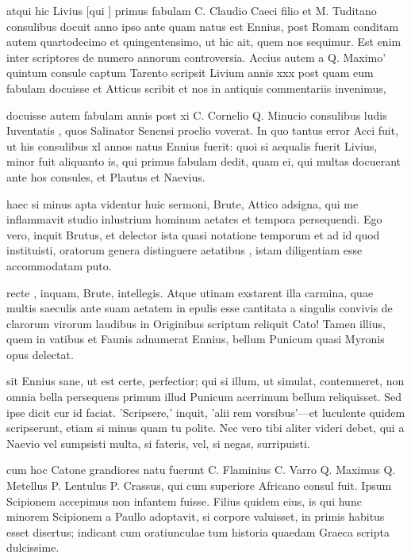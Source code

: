  atqui hic Livius [qui ] primus fabulam C. Claudio Caeci filio et M. Tuditano consulibus docuit anno ipso ante quam natus est Ennius, post Romam conditam autem quartodecimo et quingentensimo, ut hic ait, quem nos sequimur. Est enim inter scriptores de numero annorum controversia. Accius autem a Q. Maximo' quintum consule captum Tarento scripsit Livium annis xxx post quam eum fabulam docuisse et Atticus scribit et nos in antiquis commentariis invenimus,

 docuisse autem fabulam annis post xi C. Cornelio Q. Minucio consulibus ludis Iuventatis , quos Salinator Senensi proelio voverat. In quo tantus error Acci fuit, ut his consulibus xl annos natus Ennius fuerit: quoi si aequalis fuerit Livius, minor fuit aliquanto is, qui primus fabulam dedit, quam ei, qui multas docuerant ante hos consules, et Plautus et Naevius.

 haec si minus apta videntur huic sermoni, Brute, Attico adsigna, qui me inflammavit studio inlustrium hominum aetates et tempora persequendi. Ego vero, inquit Brutus, et delector ista quasi notatione temporum et ad id quod instituisti, oratorum genera distinguere aetatibus , istam diligentiam esse accommodatam puto.

 recte , inquam, Brute, intellegis. Atque utinam exstarent illa carmina, quae multis saeculis ante suam aetatem in epulis esse cantitata a singulis convivis de clarorum virorum laudibus in Originibus scriptum reliquit Cato! Tamen illius, quem in vatibus et Faunis adnumerat Ennius, bellum Punicum quasi Myronis opus delectat.

 sit Ennius sane, ut est certe, perfectior; qui si illum, ut simulat, contemneret, non omnia bella persequens primum illud Punicum acerrimum bellum reliquisset. Sed ipse dicit cur id faciat. 'Scripsere,' inquit, 'alii rem vorsibus'—et luculente quidem scripserunt, etiam si minus quam tu polite. Nec vero tibi aliter videri debet, qui a Naevio vel sumpsisti multa, si fateris, vel, si negas, surripuisti.

 cum hoc Catone grandiores natu fuerunt C. Flaminius C. Varro Q. Maximus Q. Metellus P. Lentulus P. Crassus, qui cum superiore Africano consul fuit. Ipsum Scipionem accepimus non infantem fuisse. Filius quidem eius, is qui hunc minorem Scipionem a Paullo adoptavit, si corpore valuisset, in primis habitus esset disertus; indicant cum oratiunculae tum historia quaedam Graeca scripta dulcissime.

